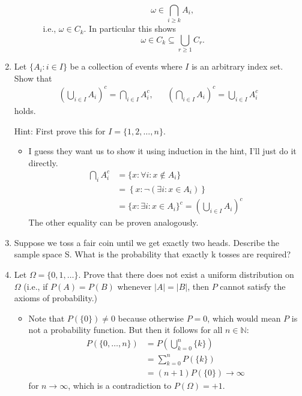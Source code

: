 \documentclass{article}
\begin{document}
\begin{enumerate}
\begin{enumerate}
\begin{itemize}
					$$
					\omega \in \bigcap_{i \geq k} A_i,
					$$
					i.e., $\omega \in C_k$. In particular this shows
					$$
					\omega \in C_k \subseteq \bigcup_{r \geq 1} C_r.
					$$
				\end{itemize}
		\end{enumerate}
	\item Let $\{A_i : i \in I\}$ be a collection of events where $I$ is an arbitrary index set. Show that
	$$
	\begin{aligned}
	\left( \bigcup_{i \in I} A_i \right)^c = \bigcap_{i \in I} A_i^c, && \left( \bigcap_{i \in I} A_i \right)^c = \bigcup_{i \in I} A_i^c
	\end{aligned}
	$$
	holds.

	Hint: First prove this for $I = \{1, 2, \dots, n\}$.
		\begin{itemize}
			\item I guess they want us to show it using induction in the hint, I'll just do it directly.
			$$
			\begin{aligned}
			\bigcap_i A_i^c &= \{x : \forall i : x \notin A_i\} \\
			&= \left\{x : \neg \left( \exists i : x \in A_i \right)\right\} \\
			&= \{x : \exists i : x \in A_i\}^c = \left( \bigcup_{i \in I} A_i \right)^c
			\end{aligned}
			$$
			The other equality can be proven analogously.
		\end{itemize}
	\item Suppose we toss a fair coin until we get exactly two heads. Describe the sample space S. What is the probability that exactly k tosses are required?
	\item Let $\Omega = \{0, 1, \dots \}$. Prove that there does not exist a uniform distribution on $\Omega$ (i.e., if $P(A) = P(B)$ whenever $|A| = |B|$, then $P$ cannot satisfy the axioms of probability.)
		\begin{itemize}
			\item Note that $P(\{0\}) \neq 0$ because otherwise $P = 0$, which would mean $P$ is not a probability function. But then it follows for all $n \in \mathbb{N}$:
			$$
			\begin{aligned}
			P(\{0, \dots, n\}) &= P\left(\bigcup_{k = 0}^n \{k\} \right) \\
			&= \sum_{k = 0}^n P(\{k\}) \\
			&= (n + 1)P(\{0\}) \rightarrow \infty
			\end{aligned}
			$$
			for $n \rightarrow \infty$, which is a contradiction to $P(\Omega) = +1$.

\end{itemize}
\end{enumerate}
\end{document}
